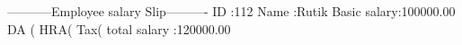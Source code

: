 
-----------Employee salary Slip----------
		ID          :112
		Name        :Rutik
		Basic salary:100000.00
		DA (%
		HRA(%
		Tax(%
		total salary         :120000.00